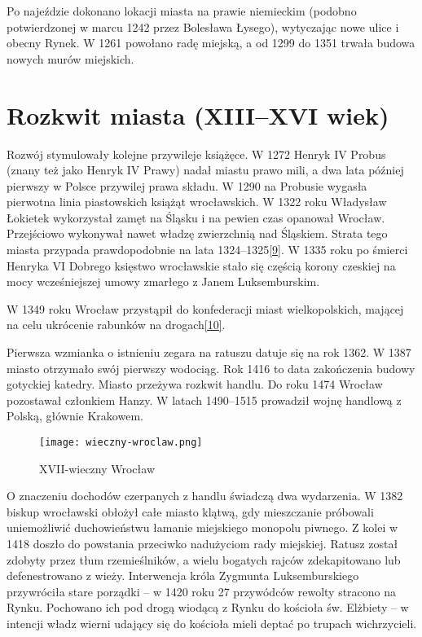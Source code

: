 \documentclass{article}
\begin{document}
Po najeździe dokonano lokacji miasta na prawie niemieckim (podobno potwierdzonej w marcu 1242 przez Bolesława Łysego), wytyczając nowe ulice i obecny Rynek. W 1261 powołano radę miejską, a od 1299 do 1351 trwała budowa nowych murów miejskich.

\section{Rozkwit miasta (XIII–XVI wiek)}
Rozwój stymulowały kolejne przywileje książęce. W 1272 Henryk IV Probus (znany też jako Henryk IV Prawy) nadał miastu prawo mili, a dwa lata później pierwszy w Polsce przywilej prawa składu. W 1290 na Probusie wygasła pierwotna linia piastowskich książąt wrocławskich. W 1322 roku Władysław Łokietek wykorzystał zamęt na Śląsku i na pewien czas opanował Wrocław. Przejściowo wykonywał nawet władzę zwierzchnią nad Śląskiem. Strata tego 
 miasta przypada prawdopodobnie na lata 1324–1325\hyperref[9]{[9]}. W 1335 roku po śmierci Henryka VI Dobrego księstwo wrocławskie stało się częścią korony czeskiej na mocy wcześniejszej umowy zmarłego z Janem Luksemburskim.

W 1349 roku Wrocław przystąpił do konfederacji miast wielkopolskich, mającej na celu ukrócenie rabunków na drogach\hyperref[10]{[10]}.

Pierwsza wzmianka o istnieniu zegara na ratuszu datuje się na rok 1362. W 1387 miasto otrzymało swój pierwszy wodociąg. Rok 1416 to data zakończenia budowy gotyckiej katedry. Miasto przeżywa rozkwit handlu. Do roku 1474 Wrocław pozostawał członkiem Hanzy. W latach 1490–1515 prowadził wojnę handlową z Polską, głównie Krakowem.

\begin{wrapfigure}{r}{0.42\textwidth} 
\begin{center}
\vspace{-20pt}
\texttt{[image: wieczny-wroclaw.png]}
\end{center}
\vspace{-20pt}
\caption{XVII-wieczny Wrocław}
\vspace{-10pt}
\end{wrapfigure}

O znaczeniu dochodów czerpanych z handlu świadczą dwa wydarzenia. W 1382 biskup wrocławski obłożył całe miasto klątwą, gdy mieszczanie próbowali uniemożliwić duchowieństwu łamanie miejskiego monopolu piwnego. Z kolei w 1418 doszło do powstania przeciwko nadużyciom rady miejskiej. Ratusz został zdobyty przez tłum rzemieślników, a wielu bogatych rajców zdekapitowano lub defenestrowano z wieży. Interwencja króla Zygmunta Luksemburskiego przywróciła stare porządki – w 1420 roku 27 przywódców rewolty stracono na Rynku. Pochowano ich pod drogą wiodącą z Rynku do kościoła św. Elżbiety – w intencji władz wierni udający się do kościoła mieli deptać po trupach wichrzycieli.
\end{document}

